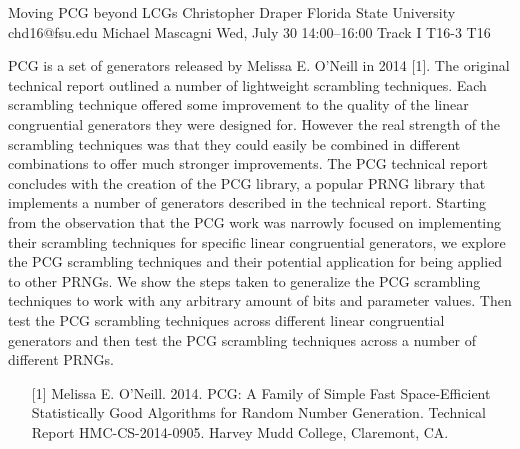 \begin{talk}
  {Moving PCG beyond LCGs}%
  {Christopher Draper}%
  {Florida State University}%
  {chd16@fsu.edu}%
  {Michael Mascagni}%
  {}%
  {Wed, July 30 14:00–16:00 Track I}%
  {T16-3}%
  {T16}%
  
				
			
PCG is a set of generators released by Melissa E. O’Neill in 2014 [1]. The original technical report outlined a number of lightweight
scrambling techniques. Each scrambling technique offered some improvement to the quality of the linear congruential generators
they were designed for. However the real strength of the scrambling techniques was that they could easily be combined in different
combinations to offer much stronger improvements. The PCG technical report concludes with the creation of the PCG library, a
popular PRNG library that implements a number of generators described in the technical report. Starting from the observation that the
PCG work was narrowly focused on implementing their scrambling techniques for specific linear congruential generators, we explore
the PCG scrambling techniques and their potential application for being applied to other PRNGs. We show the steps taken to generalize the PCG
scrambling techniques to work with any arbitrary amount of bits and parameter values. Then test the PCG scrambling techniques
across different linear congruential generators and then test the PCG scrambling techniques across a number of different PRNGs.
\medskip

\begin{enumerate}
	\item[{[1]}] Melissa E. O’Neill. 2014. PCG: A Family of Simple Fast Space-Efficient Statistically Good Algorithms for Random Number Generation. Technical Report HMC-CS-2014-0905. Harvey Mudd College, Claremont, CA.
\end{enumerate}

\end{talk}

